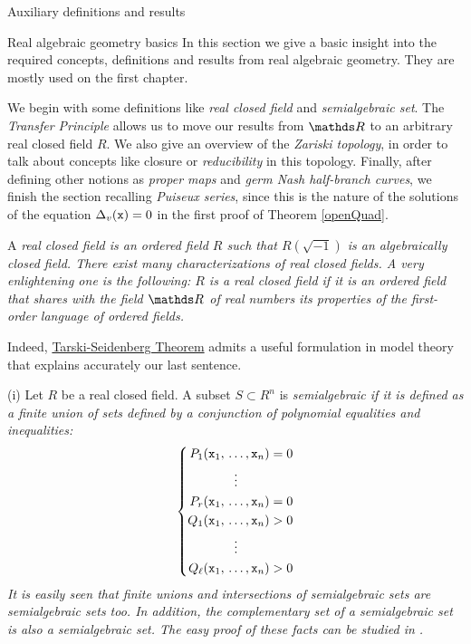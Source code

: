 \documentclass[11pt, a4paper, english, twoside, notitlepage, openright]{report}
\begin{document}
\appendix
\begin{chapter}{Auxiliary definitions and results}\label{AA}

\begin{section}{Real algebraic geometry basics}
In this section we give a basic insight into the required concepts, definitions and results from real algebraic geometry. They are mostly used on the first chapter.

We begin with some definitions like \emph{real closed field} and \emph{semialgebraic set}. The \emph{Transfer Principle} allows us to move our results from $\R$ to an arbitrary real closed field $R$. We also give an overview of the \emph{Zariski topology}, in order to talk about concepts like closure or \emph{reducibility} in this topology. Finally, after defining other notions as \emph{proper maps} and \emph{germ Nash half-branch curves}, we finish the section recalling \emph{Puiseux series}, since this is the nature of the solutions of the equation $\Delta_v({\tt x})=0$ in the first proof of Theorem \ref{openQuad}.
\begin{definition}\label{realCField}
	A \em real closed field \em is an ordered field $R$ such that $R(\sqrt{-1})$ is an algebraically closed field. There exist many characterizations of real closed fields. A very enlightening one is the following: $R$ is a real closed field if it is an ordered field that shares with the field $\R$ of real numbers its properties of the first-order language of ordered fields. 
\end{definition}

Indeed, \hyperref[tarskiSeidenberg]{Tarski-Seidenberg Theorem} admits a useful formulation in model theory that explains accurately our last sentence.

\begin{definitions}\label{semialgSet} (i) Let $R$ be a real closed field. A subset $S\subset R^n$ is \em semialgebraic \em if it is defined as a finite union of sets defined by a conjunction of polynomial equalities and inequalities: 
	\begin{equation*}
	\left\{
	\begin{aligned}
		P_1({\tt x}_1,\, .\,&.\,.\,,{\tt x}_n)=0\\
		&\vdots\\
		P_r({\tt x}_1,\, .\,&.\,.\,,{\tt x}_n)=0\\
		Q_1({\tt x}_1,\, .\,&.\,.\,,{\tt x}_n)>0 \\
		&\vdots\\
		Q_{\ell}({\tt x}_1,\, .\,&.\,.\,,{\tt x}_n)>0\\
	\end{aligned}
	\right.
	\end{equation*}
It is easily seen that finite unions and intersections of semialgebraic sets are semialgebraic sets too. In addition, the complementary set of a semialgebraic set is also a semialgebraic set. The easy proof of these facts can be studied in \cite[Ch.2]{bcr}.
	

\end{definitions}
\end{section}
\end{chapter}
\end{document}
